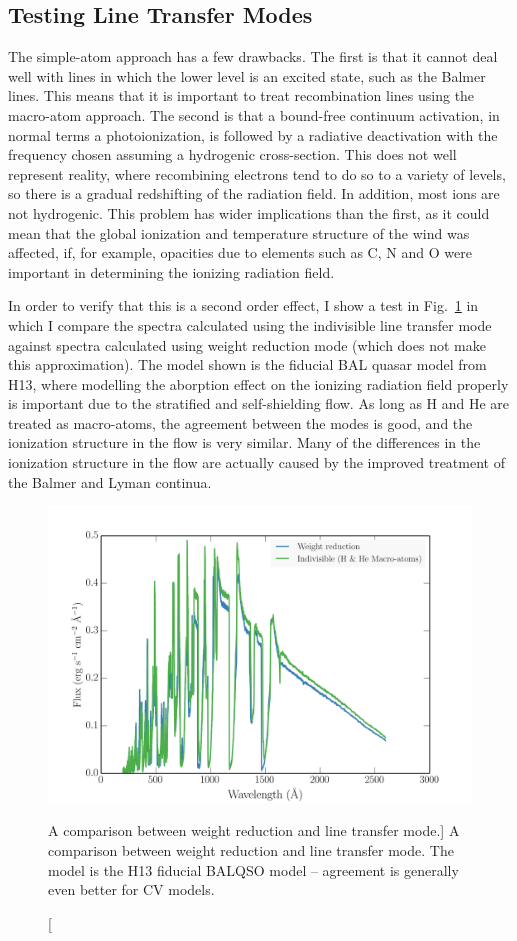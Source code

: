 \subsection{Testing Line Transfer Modes}
\label{sec:line_test}
The simple-atom approach has a few drawbacks. The first is that it cannot
deal well with lines in which the lower level is an excited state, such as the 
Balmer lines. This means that it is important to treat recombination lines using the 
macro-atom approach. The second is that a bound-free continuum activation, 
in normal terms a photoionization, is followed by a radiative deactivation
with the frequency chosen assuming a hydrogenic cross-section. 
This does not well represent reality, where recombining
electrons tend to do so to a variety of levels, so there is a gradual
redshifting of the radiation field. In addition, most ions are not hydrogenic. 
This problem has wider implications than
the first, as it could mean that the global ionization and temperature structure of the wind
was affected, if, for example, opacities due to elements such as C, N and O were important
in determining the ionizing radiation field.

In order to verify that this is a second order effect, 
I show a test in Fig.~\ref{fig:line_transfer} in which I compare the spectra calculated
using the indivisible 
line transfer mode against spectra calculated
using weight reduction mode (which does not make this 
approximation). The model shown is the fiducial BAL quasar model from
H13, where modelling the aborption effect on the ionizing radiation field 
properly is important due to the stratified
and self-shielding flow. As long as H and He are treated as macro-atoms, the agreement
between the modes is good, and the ionization structure in the flow is very similar.
Many of the differences in the ionization structure in the flow are actually
caused by the improved treatment of the Balmer and Lyman continua.

\begin{figure}
\centering
\includegraphics[width=1.0\textwidth]{figures/03-radtrans/line_transfer_comparison.png}
\caption
[A comparison between weight reduction and line transfer mode.]
{
A comparison between weight reduction and line transfer mode. 
The model is the H13 fiducial BALQSO model -- agreement is generally even
better for CV models. 
} 
\label{fig:line_transfer}
\end{figure}

